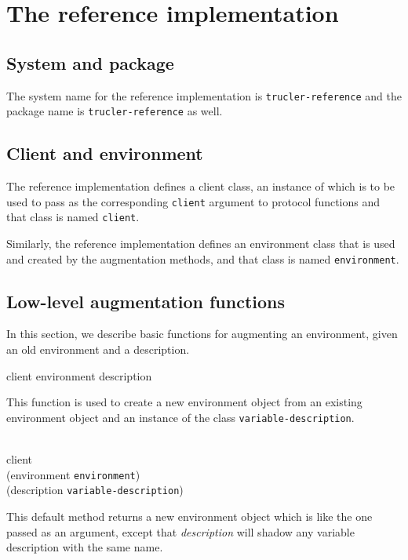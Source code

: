 \chapter{The reference implementation}

\section{System and package}

The \asdf{} system name for the reference implementation is
\texttt{trucler-reference} and the package name is
\texttt{trucler-reference} as well.

\section{Client and environment}

The reference implementation defines a client class, an instance of
which is to be used to pass as the corresponding \texttt{client}
argument to protocol functions and that class is named
\texttt{client}.

Similarly, the reference implementation defines an environment class that
is used and created by the augmentation methods, and that class is
named \texttt{environment}.

\section{Low-level augmentation functions}

In this section, we describe basic functions for augmenting an
environment, given an old environment and a description.

{\footnotesize
{} {client environment description}
}

This function is used to create a new environment object from an
existing environment object and an instance of the class
\texttt{variable-description}.

{\footnotesize
{}\\
           {client\\
            (environment {\tt environment})\\
            (description {\tt variable-description})}
}

This default method returns a new environment object which is like the
one passed as an argument, except that \textit{description}
will shadow any variable description with the same name.

